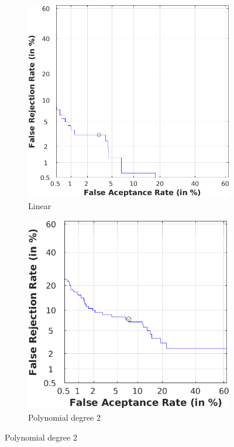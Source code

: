\documentclass[11pt]{article}
\begin{document}
\begin{figure}[h!]
  \centering
       \begin{subfigure}[t]{0.4\textwidth}
         \centering
         \includegraphics[scale=0.55]{img/3a_linear_det}
         \caption{Linear}
     \end{subfigure}%
     \quad\quad
     \begin{subfigure}[t]{0.4\textwidth}
         \centering
         \includegraphics[scale=0.73]{img/3a_poly2_det}
         \caption{Polynomial degree 2}
     \end{subfigure}


\end{figure}
\end{document}
